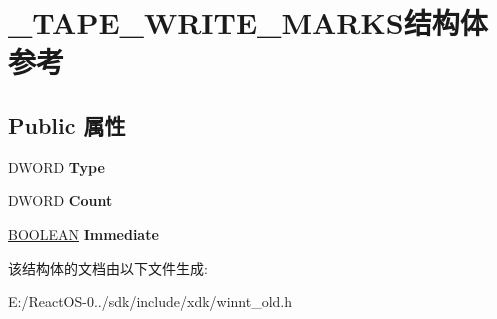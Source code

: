 \hypertarget{struct___t_a_p_e___w_r_i_t_e___m_a_r_k_s}{}\section{\+\_\+\+T\+A\+P\+E\+\_\+\+W\+R\+I\+T\+E\+\_\+\+M\+A\+R\+K\+S结构体 参考}
\label{struct___t_a_p_e___w_r_i_t_e___m_a_r_k_s}
\subsection*{Public 属性}
\begin{DoxyCompactItemize}
\item 
\mbox{\label{struct___t_a_p_e___w_r_i_t_e___m_a_r_k_s_a552e6059a6cb36c12be9b67840ee42a0}} 
D\+W\+O\+RD {\bfseries Type}
\item 
\mbox{\label{struct___t_a_p_e___w_r_i_t_e___m_a_r_k_s_a77ba7a6b258c90fe03914d8aba1dfe4a}} 
D\+W\+O\+RD {\bfseries Count}
\item 
\mbox{\label{struct___t_a_p_e___w_r_i_t_e___m_a_r_k_s_a950809e86f030913fa01cd8e264ee5f9}} 
\hyperlink{_processor_bind_8h_a112e3146cb38b6ee95e64d85842e380a}{B\+O\+O\+L\+E\+AN} {\bfseries Immediate}
\end{DoxyCompactItemize}


该结构体的文档由以下文件生成\+:\begin{DoxyCompactItemize}
\item 
E\+:/\+React\+O\+S-\/0../sdk/include/xdk/winnt\+\_\+old.\+h\end{DoxyCompactItemize}
